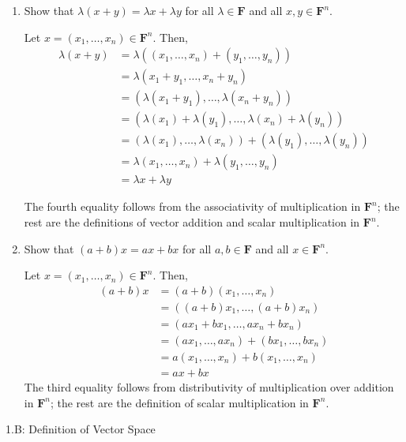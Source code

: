 \documentclass{book}
\begin{document}
\begin{enumerate}
\item Show that \(\lambda(x+y)=\lambda{x}+\lambda{y}\) for all \(\lambda \in \textbf{F}\) and all \(x,y \in \textbf{F}^n\).

Let \(x = (x_1,\dots,x_n) \in \textbf{F}^n\).  Then,
\begin{equation*}
\begin{split}
\lambda(x+y) &= \lambda((x_1,\dots,x_n)+(y_1,\dots,y_n)) \\
&=\lambda(x_1+y_1,\dots,x_n+y_n) \\
&=(\lambda(x_1+y_1),\dots,\lambda(x_n+y_n)) \\
&=(\lambda(x_1)+\lambda(y_1),\dots,\lambda(x_n)+\lambda(y_n)) \\
&=(\lambda(x_1),\dots,\lambda(x_n))+(\lambda(y_1),\dots,\lambda(y_n)) \\
&= \lambda(x_1,\dots,x_n)+\lambda(y_1,\dots,y_n) \\
&= \lambda{x}+\lambda{y}
\end{split}
\end{equation*}

The fourth equality follows from the associativity of multiplication in \(\textbf{F}^n\); the rest are the definitions of vector addition and scalar multiplication in \(\textbf{F}^n\).

\item Show that \((a+b)x=ax+bx\) for all \(a,b \in \textbf{F}\) and all \(x \in \textbf{F}^n\).

Let \(x = (x_1,\dots,x_n) \in \textbf{F}^n\).  Then,
\begin{equation*}
\begin{split}
(a+b)x &= (a+b)(x_1,\dots,x_n) \\
&= ((a+b)x_1,\dots,(a+b)x_n) \\
&=(ax_1+bx_1,\dots,ax_n+bx_n) \\
&=(ax_1,\dots,ax_n)+(bx_1,\dots,bx_n) \\
&=a(x_1,\dots,x_n)+b(x_1,\dots,x_n) \\
&=ax+bx
\end{split}
\end{equation*}
The third equality follows from distributivity of multiplication over addition in \(\textbf{F}^n\); the rest are the definition of scalar multiplication in \(\textbf{F}^n\).

\end{enumerate}

1.B: Definition of Vector Space
\end{document}
